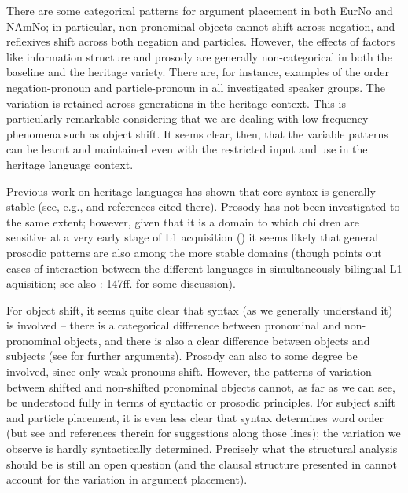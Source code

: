 \documentclass[output=paper]{langscibook}
\begin{document}
There are some categorical patterns for argument placement in both EurNo and NAmNo; in particular, non-pronominal objects cannot shift across negation, and reflexives shift across both negation and particles. However, the effects of factors like information structure and prosody are generally non-categorical in both the baseline and the heritage variety. There are, for instance, examples of the order negation-pronoun and particle-pronoun in all investigated speaker groups. The variation is retained across generations in the heritage context. This is particularly remarkable considering that we are dealing with low-frequency phenomena such as object shift. It seems clear, then, that the variable patterns can be learnt and maintained even with the restricted input and use in the heritage language context. 

Previous work on heritage languages has shown that core syntax is generally stable (see, e.g., \citealt{LohndalEtAl2019} and references cited there). Prosody has not been investigated to the same extent; however, given that it is a domain to which children are sensitive at a very early stage of L1 acquisition (\citealt{deCarvalhoEtAl2018}) it seems likely that general prosodic patterns are also among the more stable domains (though \citealt{Lleó2018} points out cases of interaction between the different languages in simultaneously bilingual L1 aquisition; see also \citealt{Polinsky2018}: 147ff. for some discussion).

For object shift, it seems quite clear that syntax (as we generally understand it) is involved – there is a categorical difference between pronominal and non-pronominal objects, and there is also a clear difference between objects and subjects (see \citealt{LyskawaEtAl2022} for further arguments). Prosody can also to some degree be involved, since only weak pronouns shift. However, the patterns of variation between shifted and non-shifted pronominal objects cannot, as far as we can see, be understood fully in terms of syntactic or prosodic principles. For subject shift and particle placement, it is even less clear that syntax determines word order (but see \citealt{Westergaard2011} and references therein for suggestions along those lines); the variation we observe is hardly syntactically determined. Precisely what the structural analysis should be is still an open question (and the clausal structure presented in  cannot account for the variation in argument placement). 
\end{document}
